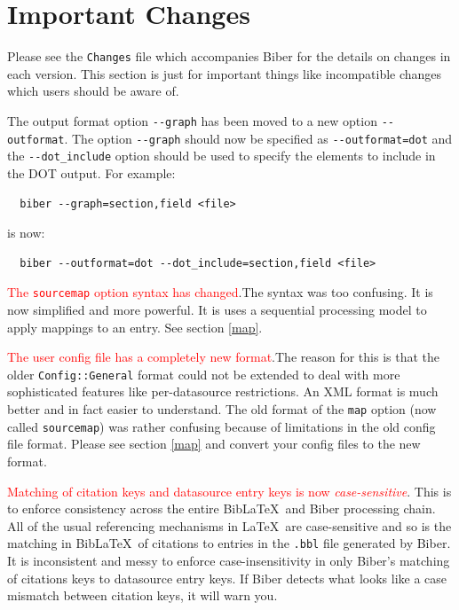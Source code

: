 \documentclass{ltxdockit}
\begin{document}
\printtitlepage
\tableofcontents

\section{Important Changes}\label{special}

Please see the \verb+Changes+ file which accompanies Biber for the
details on changes in each version. This section is just for important
things like incompatible changes which users should be aware of.

The output format option \verb+--graph+ has been moved to a
new option \verb+--outformat+. The option \verb+--graph+ should now be
specified as \verb+--outformat=dot+ and the \linebreak\verb+--dot_include+ option
should be used to specify the elements to include in the DOT output. For
example:

\begin{verbatim}
  biber --graph=section,field <file>
\end{verbatim}

\noindent is now:

\begin{verbatim}
  biber --outformat=dot --dot_include=section,field <file>
\end{verbatim}

\textcolor{red}{The \texttt{sourcemap} option syntax has changed}.The syntax
was too confusing. It is now simplified and more powerful. It is uses a
sequential processing model to apply mappings to an entry. See section
\ref{map}.

\textcolor{red}{The user config file has a completely new format}.The
  reason for this is that the older \verb+Config::General+ format
  could not be extended to deal with more sophisticated features like
  per-datasource restrictions. An XML format is much better and in
  fact easier to understand. The old format of the \verb+map+ option
  (now called \verb+sourcemap+) was rather confusing because
  of limitations in the old config file format. Please see section
  \ref{map} and convert your config files to the new format.

\textcolor{red}{Matching of citation keys and datasource entry keys is now
  \emph{case-sensitive}}. This is to enforce consistency across the entire
Bib\LaTeX\ and Biber processing chain. All of the usual referencing
mechanisms in \LaTeX\ are case-sensitive and so is the matching in
Bib\LaTeX\ of citations to entries in the \texttt{.bbl} file generated by
Biber. It is inconsistent and messy to enforce case-insensitivity in only
Biber's matching of citations keys to datasource entry keys. If Biber
detects what looks like a case mismatch between citation keys, it will warn
you.
\end{document}
